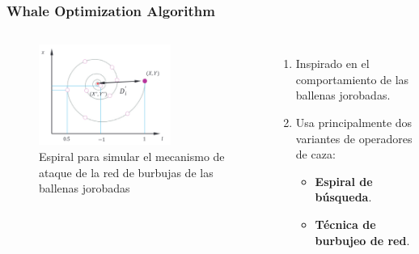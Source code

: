 \begin{frame}
  \frametitle{Whale Optimization Algorithm}
  \begin{columns}
    \begin{figure}
      \begin{center}
        \includegraphics[width=0.7\textwidth]{imagenes/chapter3/spiral-update-position-wao.png}
      \end{center}
      \caption{Espiral para simular el mecanismo de ataque de la red de burbujas de las ballenas jorobadas \footnotemark[8]}
    \end{figure}
    \begin{enumerate}
      \item Inspirado en el comportamiento de las ballenas jorobadas.
      \item Usa principalmente dos variantes de operadores de caza:
            \begin{itemize}
              \item \textbf{Espiral de búsqueda}.
              \item \textbf{Técnica de burbujeo de red}.
            \end{itemize}
    \end{enumerate}
  \end{columns}
\end{frame}

